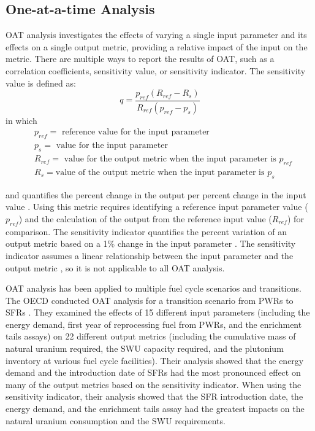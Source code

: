 \subsection{One-at-a-time Analysis}
\gls{OAT} analysis 
investigates the effects of varying a single input parameter and its effects
on a single output metric, providing a relative impact of the input on the 
metric. There are multiple ways to report the results of \gls{OAT}, such as a 
correlation coefficients, sensitivity value, or sensitivity indicator. 
The sensitivity value is defined as:
\begin{equation}
    q = \frac{p_{ref}(R_{ref}-R_s)}{R_{ref}(p_{ref}-p_s)}
    \label{eq:sensitivity_metric}
\end{equation}
in which 
\begin{align*}
    &p_{ref} = \text{ reference value for the input parameter}\\
    &p_s = \text{ value for the input parameter}\\
    &R_{ref} = \text{ value for the output metric when the input parameter is }p_{ref}\\
    &R_s = \text{value of the output metric when the input parameter is }p_s
\end{align*}

\noindent and quantifies the percent change in the output 
per percent change in the input value \cite{noauthor_effects_2017}. 
Using this metric requires identifying a reference input parameter value 
($p_{ref}$) and the calculation of the output from the reference input value 
($R_{ref}$) for comparison. The sensitivity indicator  
quantifies the percent variation of an output metric based on a 1\% change in 
the input parameter \cite{noauthor_effects_2017}. The sensitivity indicator 
assumes a linear relationship between the input parameter and the output metric 
\cite{noauthor_effects_2017}, so it is not applicable to all \gls{OAT} 
analysis. 

\gls{OAT} analysis has been applied to multiple fuel cycle scenarios and 
transitions. The \gls{OECD} conducted \gls{OAT} analysis for a transition scenario 
from \glspl{PWR} to \glspl{SFR} \cite{noauthor_effects_2017}. They examined 
the effects of 15 different 
input parameters (including the energy demand, first year of reprocessing fuel 
from \glspl{PWR}, and the enrichment tails assays) on 22 different output metrics 
(including the cumulative mass of natural uranium required, the \gls{SWU} capacity 
required, and the plutonium inventory at various fuel cycle facilities). 
Their analysis showed that the energy demand and the introduction date of 
\glspl{SFR} had the most pronounced effect on many of the output metrics 
based on the 
sensitivity indicator. When using the sensitivity indicator, their analysis 
showed that the \gls{SFR} introduction date, the energy demand, and the 
enrichment tails assay had the greatest impacts on the natural uranium 
consumption and the \gls{SWU} requirements. 

